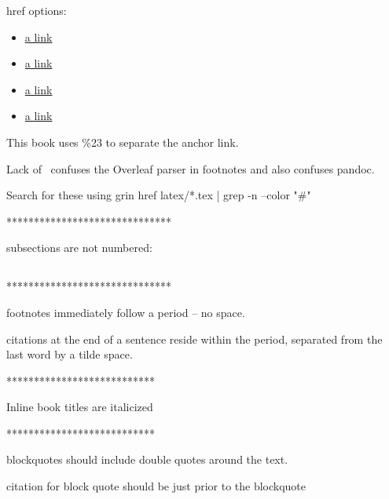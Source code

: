 
href options:
\begin{itemize}
    \item \href{https://en.wikipedia.org/wiki/Business_process%23Adam_Smith}{a link}
    \item \href{https://en.wikipedia.org/wiki/Business_process\%23Adam_Smith}{a link}
    \item \href{https://en.wikipedia.org/wiki/Business_process#Adam_Smith}{a link}
    \item \href{https://en.wikipedia.org/wiki/Business_process\#Adam_Smith}{a link}
\end{itemize}
This book uses \%23 to separate the anchor link. 

Lack of \ confuses the Overleaf parser in footnotes and also confuses pandoc.

Search for these using
grin href latex/*.tex | grep -n --color "#"

******************************

subsections are not numbered: \subsection*{}

******************************

footnotes immediately follow a period -- no space. 

citations at the end of a sentence reside within the period, separated from the last word by a tilde space.

***************************

Inline book titles are italicized

***************************

blockquotes should include double quotes around the text.

citation for block quote should be just prior to the blockquote